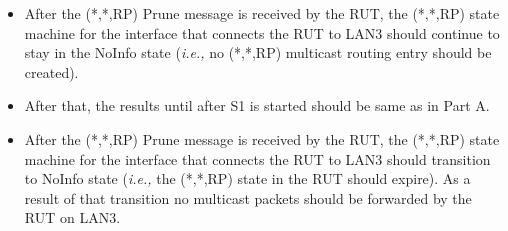 \documentclass[11pt]{report}
\newcommand{\ie}{\emph{i.e.,}\xspace}
\begin{document}

\begin{itemize}

  \item After the (*,*,RP) Prune message is received by the RUT,
  the (*,*,RP) state machine for the interface that connects the RUT to
  LAN3 should continue to stay in the NoInfo state (\ie no (*,*,RP) multicast
  routing entry should be created).
  
  \item After that, the results until after S1 is started should be same as in
  Part A.

  \item After the (*,*,RP) Prune message is received by the RUT,
  the (*,*,RP) state machine for the interface that connects the RUT to
  LAN3 should transition to NoInfo state
  (\ie the (*,*,RP) state in the RUT should expire).
  As a result of that transition no multicast packets should be
  forwarded by the RUT on LAN3.

\end{itemize}

\end{document}
